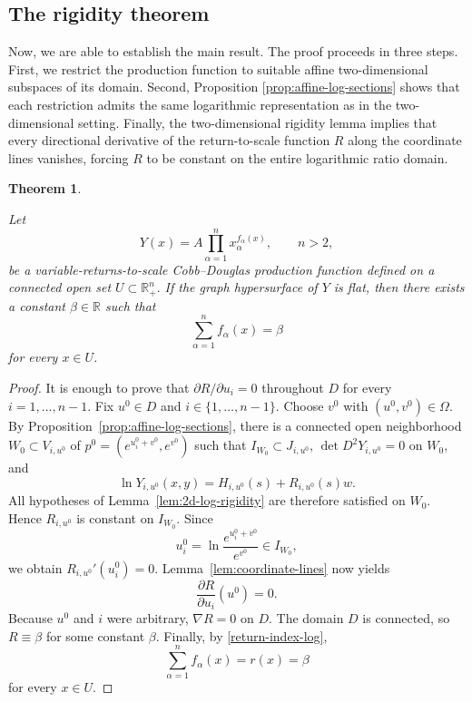 \documentclass[12pt]{amsart}
\newtheorem{theorem}{Theorem}[section]
\begin{document}
\subsection{The rigidity theorem}\label{S5.4}

Now, we are able to establish the main result. The proof proceeds in
three steps. First, we restrict the production function to suitable
affine two-dimensional subspaces of its domain. Second, Proposition
\ref{prop:affine-log-sections} shows that each restriction admits the
same logarithmic representation as in the two-dimensional setting.
Finally, the two-dimensional rigidity lemma implies that every
directional derivative of the return-to-scale function \(R\) along the
coordinate lines vanishes, forcing \(R\) to be constant on the entire
logarithmic ratio domain.

\begin{theorem}
\label{thm:main-rigidity}

Let
\[
Y(x)
=
A\prod_{\alpha=1}^{n}
x_\alpha^{f_\alpha(x)},
\qquad
n>2,
\]
be a variable-returns-to-scale Cobb--Douglas production function defined
on a connected open set
\(
U\subset\mathbb R_+^n.
\)
If the graph hypersurface of \(Y\) is flat, then there exists a constant
\(
\beta\in\mathbb R
\)
such that
\[
\sum_{\alpha=1}^{n}f_\alpha(x)
=
\beta
\]
for every \(x\in U\).

\end{theorem}

\begin{proof}
It is enough to prove that $\partial R/\partial u_i=0$ throughout $D$ for every $i=1,\ldots,n-1$. Fix $u^0\in D$ and $i\in\{1,\ldots,n-1\}$. Choose $v^0$ with $(u^0,v^0)\in\Omega$. By Proposition~\ref{prop:affine-log-sections}, there is a connected open neighborhood $W_0\subset V_{i,u^0}$ of
\(
p^0=\left(e^{u_i^0+v^0},e^{v^0}\right)
\)
such that $I_{W_0}\subset J_{i,u^0}$, $\det D^2Y_{i,u^0}=0$ on $W_0$, and
\[
\ln Y_{i,u^0}(x,y)=H_{i,u^0}(s)+R_{i,u^0}(s)w.
\]
All hypotheses of Lemma~\ref{lem:2d-log-rigidity} are therefore satisfied on $W_0$. Hence $R_{i,u^0}$ is constant on $I_{W_0}$. Since
\[
u_i^0=\ln\frac{e^{u_i^0+v^0}}{e^{v^0}}\in I_{W_0},
\]
we obtain $R_{i,u^0}'(u_i^0)=0$. Lemma~\ref{lem:coordinate-lines} now yields
\[
\frac{\partial R}{\partial u_i}(u^0)=0.
\]
Because $u^0$ and $i$ were arbitrary, $\nabla R=0$ on $D$. The domain $D$ is connected, so $R\equiv\beta$ for some constant $\beta$. Finally, by \eqref{return-index-log},
\[
\sum_{\alpha=1}^n f_\alpha(x)=r(x)=\beta
\]
for every $x\in U$.
\end{proof}
\end{document}
